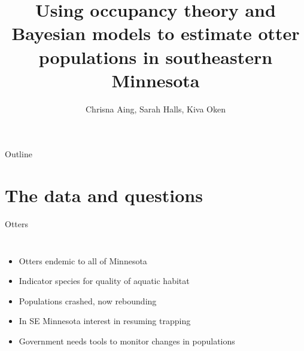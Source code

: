 \documentclass{beamer}
\title{Using occupancy theory and Bayesian models to estimate otter populations
in southeastern Minnesota}
\author[Aing, Halls, Oken]{Chrisna Aing, Sarah Halls, Kiva Oken}
\institute{Carleton College}
\begin{document}
{
	\begin{frame}
		\titlepage
	\end{frame}
}

\begin{frame}{Outline}
	\tableofcontents[pausesections]
\end{frame}

\section{The data and questions}
\begin{frame}{Otters}
	\begin{columns}
		\column{5cm}
		\begin{itemize}[<+->]
			\item Otters endemic to all of Minnesota
			\item Indicator species for quality of aquatic habitat
			\item Populations crashed, now rebounding
			\item In SE Minnesota interest in resuming trapping
			\item Government needs tools to monitor changes in populations
		\end{itemize}
		\column{5cm}
	\end{columns}
\end{frame}
\end{document}
